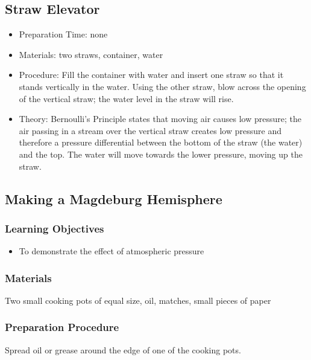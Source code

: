\subsection{Straw Elevator}
\begin{itemize}
\item{Preparation Time: none}
\item{Materials: two straws, container, water}
\item{Procedure: Fill the container with water and insert one straw so that it stands vertically in the water. Using the other straw, blow across the opening of the vertical straw; the water level in the straw will rise.}
\item{Theory: Bernoulli’s Principle states that moving air causes low pressure; the air passing in a stream over the vertical straw creates low pressure and therefore a pressure differential between the bottom of the straw (the water) and the top. The water will move towards the lower pressure, moving up the straw.}
\end{itemize}


\subsection{Making a Magdeburg Hemisphere}

\subsubsection*{Learning Objectives}
\begin{itemize}
\item{To demonstrate the effect of atmospheric pressure} 
\end{itemize}

\subsubsection*{Materials}
Two small cooking pots of equal size, oil, matches, small pieces of paper

\subsubsection*{Preparation Procedure}
Spread oil or grease around the edge of one of the cooking pots.

